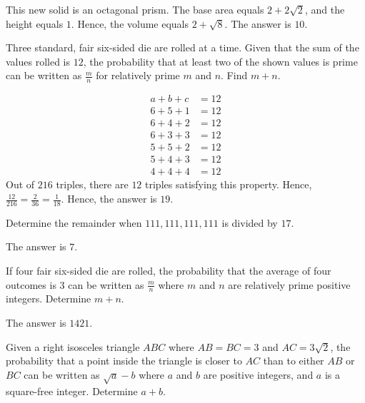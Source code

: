 \begin{solution}
This new solid is an octagonal prism. The base area equals $2+2\sqrt{2}$, and the height equals $1$. Hence, the volume equals $2+\sqrt{8}$. The answer is $10$.
\end{solution}

\begin{problem}
Three standard, fair six-sided die are rolled at a time. Given that the sum of the values rolled is $12$, the probability that at least two of the shown values is prime can be written as $\frac{m}{n}$ for relatively prime $m$ and $n$. Find $m+n$.
\end{problem}


\begin{solution}
\begin{align*}
a+b+c&=12\\
6+5+1&=12\\ 
6+4+2&=12\\
6+3+3&=12\\ 
5+5+2&=12\\ 
5+4+3&=12\\ 
4+4+4&=12
\end{align*}
Out of $216$ triples, there are $12$ triples satisfying this property. Hence, $\frac{12}{216}=\frac{2}{36}=\frac{1}{18}$. Hence, the answer is $19$.
\end{solution}

\begin{problem}
Determine the remainder when $111,111,111,111$ is divided by $17$.
\end{problem}

\begin{solution}
The answer is $7$.
\end{solution}

\begin{problem}
If four fair six-sided die are rolled, the probability that the average of four outcomes is $3$ can be written as $\frac{m}{n}$ where $m$ and $n$ are relatively prime positive integers. Determine $m+n$.
\end{problem}

\begin{solution}
The answer is $1421$.
\end{solution}

\begin{problem}
Given a right isosceles triangle $ABC$ where $AB=BC=3$ and $AC=3\sqrt{2}$, the probability that a point inside the triangle is closer to $AC$ than to either $AB$ or $BC$ can be written as $\sqrt{a}-b$ where $a$ and $b$ are positive integers, and $a$ is a square-free integer. Determine $a+b$.
\end{problem}

